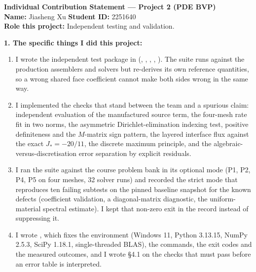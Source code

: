 \clearpage
\begin{formbox}
\small
\textbf{Individual Contribution Statement --- Project 2 (PDE BVP)}\\[0.3em]
\textbf{Name:} Jiasheng Xu \hfill \textbf{Student ID:} 2251640\\
\textbf{Role this project:} Independent testing and validation.

\textbf{1. The specific things I did this project:}
\begin{enumerate}[leftmargin=1.5em,itemsep=1pt,topsep=2pt]
    \item I wrote the independent test package in 
    (, ,
    , ,
    ). The suite runs against the production assemblers
    and solvers but re-derives its own reference quantities, so a wrong shared
    face coefficient cannot make both sides wrong in the same way.
    \item I implemented the checks that stand between the team and a spurious
    claim: independent evaluation of the manufactured source term, the
    four-mesh rate fit in two norms, the asymmetric Dirichlet-elimination
    indexing test, positive definiteness and the $M$-matrix sign pattern, the
    layered interface flux against the exact $J_*=-20/11$, the discrete maximum
    principle, and the algebraic-versus-discretisation error separation by
    explicit residuals.
    \item I ran the suite against the course problem bank in its optional mode
    (P1, P2, P4, P5 on four meshes, 32 solver runs) and recorded the strict
    mode that reproduces ten failing subtests on the pinned baseline snapshot
    for the known defects (coefficient validation, a diagonal-matrix
    diagnostic, the uniform-material spectral estimate). I kept that non-zero
    exit in the record instead of suppressing it.
    \item I wrote , which fixes the
    environment (Windows 11, Python 3.13.15, NumPy 2.5.3, SciPy 1.18.1,
    single-threaded BLAS), the commands, the exit codes and the measured
    outcomes, and I wrote \S4.1 on the checks that must pass before an error
    table is interpreted.
\end{enumerate}


\end{formbox}
